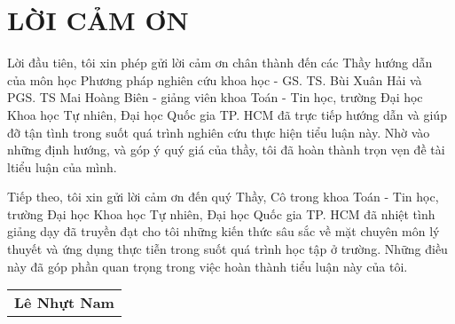 	
	
\chapter*{LỜI CẢM ƠN}

Lời đầu tiên, tôi xin phép gửi lời cảm ơn chân thành đến các Thầy hướng dẫn của môn học Phương pháp nghiên cứu khoa học - GS. TS. Bùi Xuân Hải và PGS. TS Mai Hoàng Biên - giảng viên khoa Toán - Tin học, trường Đại học Khoa học Tự nhiên, Đại học Quốc gia TP. HCM đã trực tiếp hướng dẫn và giúp đỡ tận tình trong suốt quá trình nghiên cứu thực hiện tiểu luận này. Nhờ vào những định hướng, và góp ý quý giá của thầy, tôi đã hoàn thành trọn vẹn đề tài ltiểu luận của mình.

Tiếp theo, tôi xin gửi lời cảm ơn đến quý Thầy, Cô trong khoa Toán - Tin học, trường Đại học Khoa học Tự nhiên, Đại học Quốc gia TP. HCM đã nhiệt tình giảng dạy đã truyền đạt cho tôi những kiến thức sâu sắc về mặt chuyên môn lý thuyết và ứng dụng thực tiễn trong suốt quá trình học tập ở trường. Những điều này đã góp phần quan trọng trong việc hoàn thành tiểu luận này của tôi.

\begin{flushright}
		\begin{tabular}{@{}c@{}}
			\bfseries Lê Nhựt Nam
		\end{tabular}
\end{flushright}
\thispagestyle{empty}